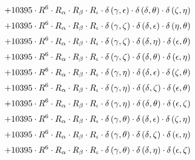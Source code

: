 \begin{subequations}
\begin{gather}
 \\[0.2em] \notag 		 + 10395 \cdot R^{6} \cdot R_{\alpha{}} \cdot R_{\beta{}} \cdot R_{\iota{}} \cdot \delta{}\left(\gamma{}, \epsilon{}\right) \cdot \delta{}\left(\delta{}, \theta{}\right) \cdot \delta{}\left(\zeta{}, \eta{}\right) 
 \\[0.2em] \notag 		 + 10395 \cdot R^{6} \cdot R_{\alpha{}} \cdot R_{\beta{}} \cdot R_{\iota{}} \cdot \delta{}\left(\gamma{}, \zeta{}\right) \cdot \delta{}\left(\delta{}, \epsilon{}\right) \cdot \delta{}\left(\eta{}, \theta{}\right) 
 \\[0.2em] \notag 		 + 10395 \cdot R^{6} \cdot R_{\alpha{}} \cdot R_{\beta{}} \cdot R_{\iota{}} \cdot \delta{}\left(\gamma{}, \zeta{}\right) \cdot \delta{}\left(\delta{}, \eta{}\right) \cdot \delta{}\left(\epsilon{}, \theta{}\right) 
 \\[0.2em] \notag 		 + 10395 \cdot R^{6} \cdot R_{\alpha{}} \cdot R_{\beta{}} \cdot R_{\iota{}} \cdot \delta{}\left(\gamma{}, \zeta{}\right) \cdot \delta{}\left(\delta{}, \theta{}\right) \cdot \delta{}\left(\epsilon{}, \eta{}\right) 
 \\[0.2em] \notag 		 + 10395 \cdot R^{6} \cdot R_{\alpha{}} \cdot R_{\beta{}} \cdot R_{\iota{}} \cdot \delta{}\left(\gamma{}, \eta{}\right) \cdot \delta{}\left(\delta{}, \epsilon{}\right) \cdot \delta{}\left(\zeta{}, \theta{}\right) 
 \\[0.2em] \notag 		 + 10395 \cdot R^{6} \cdot R_{\alpha{}} \cdot R_{\beta{}} \cdot R_{\iota{}} \cdot \delta{}\left(\gamma{}, \eta{}\right) \cdot \delta{}\left(\delta{}, \zeta{}\right) \cdot \delta{}\left(\epsilon{}, \theta{}\right) 
 \\[0.2em] \notag 		 + 10395 \cdot R^{6} \cdot R_{\alpha{}} \cdot R_{\beta{}} \cdot R_{\iota{}} \cdot \delta{}\left(\gamma{}, \eta{}\right) \cdot \delta{}\left(\delta{}, \theta{}\right) \cdot \delta{}\left(\epsilon{}, \zeta{}\right) 
 \\[0.2em] \notag 		 + 10395 \cdot R^{6} \cdot R_{\alpha{}} \cdot R_{\beta{}} \cdot R_{\iota{}} \cdot \delta{}\left(\gamma{}, \theta{}\right) \cdot \delta{}\left(\delta{}, \epsilon{}\right) \cdot \delta{}\left(\zeta{}, \eta{}\right) 
 \\[0.2em] \notag 		 + 10395 \cdot R^{6} \cdot R_{\alpha{}} \cdot R_{\beta{}} \cdot R_{\iota{}} \cdot \delta{}\left(\gamma{}, \theta{}\right) \cdot \delta{}\left(\delta{}, \zeta{}\right) \cdot \delta{}\left(\epsilon{}, \eta{}\right) 
 \\[0.2em] \notag 		 + 10395 \cdot R^{6} \cdot R_{\alpha{}} \cdot R_{\beta{}} \cdot R_{\iota{}} \cdot \delta{}\left(\gamma{}, \theta{}\right) \cdot \delta{}\left(\delta{}, \eta{}\right) \cdot \delta{}\left(\epsilon{}, \zeta{}\right) 

\end{gather}
\end{subequations}
